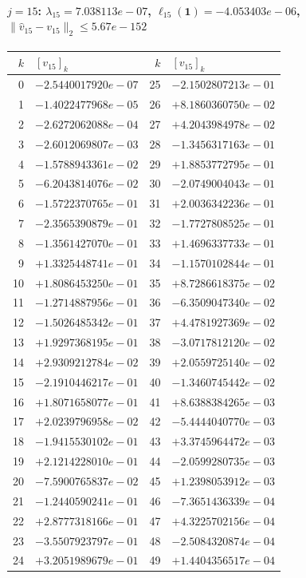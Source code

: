 \documentclass[11pt]{article}
\begin{document}
\paragraph{$j = 15$: $\lambda_{15} = 7.038113e-07$, \quad $\ell_{15}(\mathbf{1}) = -4.053403e-06$, \quad $\|\hat{v}_{15} - v_{15}\|_2 \leq 5.67e-152$}
\begin{center}
{\footnotesize
\begin{tabular}{r@{\;\;}l@{\quad}r@{\;\;}l}
\toprule
$k$ & $[v_{15}]_k$ & $k$ & $[v_{15}]_k$ \\
\midrule
0 & $-2.5440017920e-07$ & 25 & $-2.1502807213e-01$ \\
1 & $-1.4022477968e-05$ & 26 & $+8.1860360750e-02$ \\
2 & $-2.6272062088e-04$ & 27 & $+4.2043984978e-02$ \\
3 & $-2.6012069807e-03$ & 28 & $-1.3456317163e-01$ \\
4 & $-1.5788943361e-02$ & 29 & $+1.8853772795e-01$ \\
5 & $-6.2043814076e-02$ & 30 & $-2.0749004043e-01$ \\
6 & $-1.5722370765e-01$ & 31 & $+2.0036342236e-01$ \\
7 & $-2.3565390879e-01$ & 32 & $-1.7727808525e-01$ \\
8 & $-1.3561427070e-01$ & 33 & $+1.4696337733e-01$ \\
9 & $+1.3325448741e-01$ & 34 & $-1.1570102844e-01$ \\
10 & $+1.8086453250e-01$ & 35 & $+8.7286618375e-02$ \\
11 & $-1.2714887956e-01$ & 36 & $-6.3509047340e-02$ \\
12 & $-1.5026485342e-01$ & 37 & $+4.4781927369e-02$ \\
13 & $+1.9297368195e-01$ & 38 & $-3.0717812120e-02$ \\
14 & $+2.9309212784e-02$ & 39 & $+2.0559725140e-02$ \\
15 & $-2.1910446217e-01$ & 40 & $-1.3460745442e-02$ \\
16 & $+1.8071658077e-01$ & 41 & $+8.6388384265e-03$ \\
17 & $+2.0239796958e-02$ & 42 & $-5.4444040770e-03$ \\
18 & $-1.9415530102e-01$ & 43 & $+3.3745964472e-03$ \\
19 & $+2.1214228010e-01$ & 44 & $-2.0599280735e-03$ \\
20 & $-7.5900765837e-02$ & 45 & $+1.2398053912e-03$ \\
21 & $-1.2440590241e-01$ & 46 & $-7.3651436339e-04$ \\
22 & $+2.8777318166e-01$ & 47 & $+4.3225702156e-04$ \\
23 & $-3.5507923797e-01$ & 48 & $-2.5084320874e-04$ \\
24 & $+3.2051989679e-01$ & 49 & $+1.4404356517e-04$ \\
\bottomrule
\end{tabular}
}
\end{center}
\end{document}
